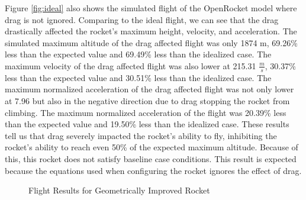 \documentclass{report}
\begin{document}
\noindent Figure \ref{fig:ideal} also shows the simulated flight of the OpenRocket model where drag is not ignored.
Comparing to the ideal flight, we can see that the drag drastically affected the rocket's maximum height, velocity, and acceleration.
The simulated maximum altitude of the drag affected flight was only 1874 m, 69.26\% less than the expected value and 69.49\% less than the idealized case.
The maximum velocity of the drag affected flight was also lower at 215.31 $\frac{m}{s}$, 30.37\% less than the expected value and 30.51\% less than the idealized case.
The maximum normalized acceleration of the drag affected flight was not only lower at 7.96 but also in the negative direction due to drag stopping the rocket from climbing.
The maximum normalized acceleration of the flight was 20.39\% less than the expected value and 19.50\% less than the idealized case.
These results tell us that drag severely impacted the rocket's ability to fly, inhibiting the rocket's ability to reach even 50\% of the expected maximum altitude.
Because of this, this rocket does not satisfy baseline case conditions.
This result is expected because the equations used when configuring the rocket ignores the effect of drag.\\

\begin{figure}[h!]
    \centering
    \caption{Flight Results for Geometrically Improved Rocket}
    \label{fig:geoImprov}
\end{figure}
\end{document}
